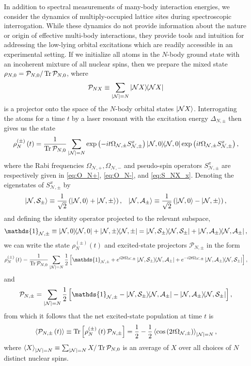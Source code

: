 \documentclass[preprint,showkeys,nofootinbib]{revtex4-1}
\newcommand{\f}{\dfrac} %
\newcommand{\p}[1]{\left(#1\right)} %
\renewcommand{\sp}[1]{\left[#1\right]} %
\newcommand{\bk}{\braket} %
\newcommand{\A}{\mathcal{A}}
\newcommand{\N}{\mathcal{N}}
\renewcommand{\P}{\mathcal{P}}
\renewcommand{\S}{\mathcal{S}}
\newcommand{\1}{\mathds{1}}
\begin{document}
In addition to spectral measurements of many-body interaction
energies, we consider the dynamics of multiply-occupied lattice sites
during spectroscopic interrogation.  While these dynamics do not
provide information about the nature or origin of effective multi-body
interactions, they provide tools and intuition for addressing the
low-lying orbital excitations which are readily accessible in an
experimental setting.  If we initialize all atoms in the $N$-body
ground state with an incoherent mixture of all nuclear spins, then we
prepare the mixed state $\rho_{N,0}=\P_{N,0}/\Tr\P_{N,0}$, where
\begin{align}
  \P_{NX} \equiv \sum_{\abs{\N}=N}\op{\N X}
  \label{eq:P_NX}
\end{align}
is a projector onto the space of the $N$-body orbital states
$\ket{\N X}$.  Interrogating the atoms for a time $t$ by a laser
resonant with the excitation energy $\Delta_{N,\pm}$ then gives us the
state
\begin{align}
  \rho_N^{(\pm)}\p{t} = \f1{\Tr\P_{N,0}}
  \sum_{\abs{\N}=N} \exp\p{-it\Omega_{\N,\pm}S_{\N,\pm}^x}
  \op{\N,0} \exp\p{it\Omega_{\N,\pm}S_{\N,\pm}^x},
\end{align}
where the Rabi frequencies $\Omega_{\N,+},\Omega_{\N,-}$ and
pseudo-spin operators $S_{\N,\pm}^x$ are respectively given in
\eqref{eq:O_N+}, \eqref{eq:O_N-}, and \eqref{eq:S_NX_x}.  Denoting the
eigenstates of $S_{\N,\pm}^x$ by
\begin{align}
  \ket{\N,\S_\pm} \equiv \f1{\sqrt2} \p{\ket{\N,0} + \ket{\N,\pm}},
  &&
  \ket{\N,\A_\pm} \equiv \f1{\sqrt2} \p{\ket{\N,0} - \ket{\N,\pm}},
\end{align}
and defining the identity operator projected to the relevant subspace,
\begin{align}
  \1_{\N,\pm} \equiv \op{\N,0} + \op{\N,\pm}
  = \op{\N,\S_\pm} + \op{\N,\A_\pm},
\end{align}
we can write the state $\rho_N^{(\pm)}\p{t}$ and excited-state
projectors $\P_{N,\pm}$ in the form
\begin{align}
  \rho_N^{(\pm)}\p{t} = \f1{\Tr\P_{N,0}} \sum_{\abs{\N}=N} \f12
  \sp{\1_{\N,\pm} + e^{i2t\Omega_{\N,\pm}}\op{\N,\S_\pm}{\N,\A_\pm}
    + e^{-i2t\Omega_{\N,\pm}}\op{\N,\A_\pm}{\N,\S_\pm}},
  \label{eq:rho_N_pm_t}
\end{align}
and
\begin{align}
  \P_{N,\pm} = \sum_{\abs{\N}=N} \f12
  \sp{\1_{\N,\pm}-\op{\N,\S_\pm}{\N,\A_\pm}-\op{\N,\A_\pm}{\N,\S_\pm}},
\end{align}
from which it follows that the net excited-state population at time
$t$ is
\begin{align}
  \bk{\P_{N,\pm}\p{t}}
  \equiv \Tr\sp{\rho_N^{(\pm)}\p{t}\P_{N,\pm}}
  = \f12 - \f12 \bk{\cos\p{2t\Omega_{\N,\pm}}}_{\abs{\N}=N},
  \label{eq:P_N_pm_t}
\end{align}
where $\bk{X}_{\abs{\N}=N}\equiv\sum_{\abs{\N}=N}X/\Tr\P_{N,0}$ is an
average of $X$ over all choices of $N$ distinct nuclear spins.
\end{document}
